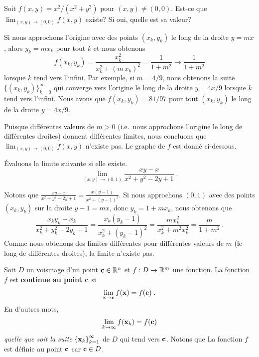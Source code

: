 {\begin{egg}
Soit $f(x,y) = x^2 / (x^2 + y^2)$ pour $(x,y) \neq (0,0)$.
Est-ce que $\displaystyle \lim_{(x,y)\rightarrow (0,0)} f(x,y)$
existe?  Si oui, quelle est sa valeur?

Si nous approchons l'origine avec des points $(x_k,y_k)$ le long de la
droite $y=mx$, alors $y_k = m x_k$ pour tout $k$ et nous obtenons
\[
f(x_k,y_k) = \frac{x_k^2}{x_k^2 + (m\,x_k)^2} = \frac{1}{1+m^2}
\rightarrow \frac{1}{1+m^2}
\]
lorsque $k$ tend vers l'infini.  Par exemple, si $m=4/9$, nous
obtenons la suite $\displaystyle \{(x_k,y_k)\}_{k=0}^\infty$ qui converge
vers l'origine le long de la droite $y=4x/9$ lorsque $k$ tend vers
l'infini.
Nous avons que $f(x_k,y_k) = 81/97$ pour tout $(x_k,y_k)$ le long de la
droite $y=4x/9$.

Puisque différentes valeurs de $m>0$ (i.e.\ nous approchons l'origine
le long de différentes droites) donnent différentes limites,
nous concluons que $\displaystyle \lim_{(x,y)\rightarrow (0,0)} f(x,y)$
n'existe pas.  Le graphe de $f$ est donné ci-dessous.
\end{egg}

\begin{egg}
Évaluons la limite suivante si elle existe.
\[
\lim_{(x,y)\rightarrow (0,1)} \frac{xy-x}{x^2+y^2-2y+1} \; .
\]

Notons que
$\displaystyle \frac{xy-x}{x^2+y^2-2y+1} = \frac{x(y-1)}{x^2+(y-1)^2}$.
Si nous approchons $(0,1)$ avec des points $(x_k,y_k)$ sur la droite
$y-1=mx$, donc $y_k = 1 + m x_k$, nous obtenons que
\[
\frac{x_k y_k-x_k}{x_k^2+y_k^2-2y_k+1} 
= \frac{x_k(y_k-1)}{x_k^2+(y_k-1)^2}
= \frac{m x_k^2}{x_k^2+m^2 x_k^2}
= \frac{m}{1+m^2} \ .
\]
Comme nous obtenons des limites différentes pour différentes valeurs de
$m$ (le long de différentes droites), la limite n'existe pas.
\end{egg}

\begin{focus}{\dfn} 
Soit $D$ un voisinage d'un point $\mathbf{c} \in \mathbb{R}^n$ et
$f:D\rightarrow \mathbb{R}^m$ une fonction.  La fonction $f$ est
{\bfseries continue au point $\mathbf{c}$} si
\[
\lim_{\mathbf{x}\rightarrow \mathbf{c}} f(\mathbf{x}) = f(\mathbf{c}) \; .
\]
En d'autres mots,
\[
\lim_{k\rightarrow \infty} f(\mathbf{x}_k) = f(\mathbf{c})
\]
{\em quelle que soit la suite} 
$\displaystyle \left\{\mathbf{x}_k\right\}_{k=1}^\infty$ de $D$ qui tend
vers $\mathbf{c}$.
Notons que La fonction $f$ est définie au point $\mathbf{c}$ car $\mathbf{c}
\in D$.   


\end{focus}}
